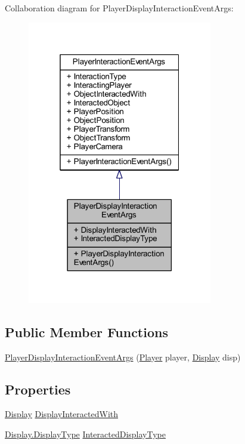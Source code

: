 Collaboration diagram for Player\+Display\+Interaction\+Event\+Args\+:\nopagebreak
\begin{figure}[H]
\begin{center}
\leavevmode
\includegraphics[width=229pt]{class_player_display_interaction_event_args__coll__graph}
\end{center}
\end{figure}
\subsection*{Public Member Functions}
\begin{DoxyCompactItemize}
\item 
\mbox{\hyperlink{class_player_display_interaction_event_args_a55466b3a7dae1ed3b825c4e6c7e4967c}{Player\+Display\+Interaction\+Event\+Args}} (\mbox{\hyperlink{class_player}{Player}} player, \mbox{\hyperlink{class_display}{Display}} disp)
\end{DoxyCompactItemize}
\subsection*{Properties}
\begin{DoxyCompactItemize}
\item 
\mbox{\hyperlink{class_display}{Display}} \mbox{\hyperlink{class_player_display_interaction_event_args_a52aeb669218099852d66e6fc02247b8f}{Display\+Interacted\+With}}
\item 
\mbox{\hyperlink{class_display_a7f7abc559192ef7e8f4a03382d3492d7}{Display.\+Display\+Type}} \mbox{\hyperlink{class_player_display_interaction_event_args_a535db31e6a8cae469787cb100f2a4ba6}{Interacted\+Display\+Type}}
\end{DoxyCompactItemize}
